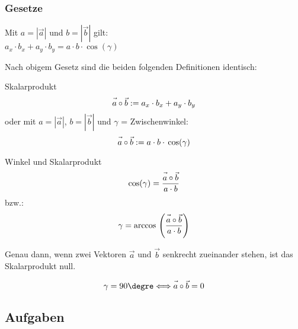 \subsubsection{Gesetze}
\begin{gesetz}{}{}
  Mit $a = |\vec{a}|$ und $b = |\vec{b}|$ gilt:\\
  $a_x\cdot{}b_x + a_y\cdot{}b_y = a\cdot{}b\cdot{}\cos(\gamma)$
\end{gesetz}
 

Nach obigem Gesetz sind die beiden folgenden Definitionen identisch:
\begin{definition}{Skalarprodukt}{}
  $$\vec{a\vphantom{b}}\circ\vec{b} := a_x\cdot{}b_x + a_y \cdot{} b_y$$
oder mit $a=|\vec{a}|$, $b=|\vec{b}|$ und $\gamma$ = Zwischenwinkel:
  $$\vec{a\vphantom{b}}\circ\vec{b} := a\cdot{}b\cdot{}\cos({\gamma})$$
\end{definition}


\begin{gesetz}{Winkel und Skalarprodukt}{}
  $$\cos(\gamma) = \frac{\vec{a\vphantom{b}}\circ\vec{b}}{a\cdot b}$$
  bzw.:
  $$\gamma = \arccos{} \left(\frac{\vec{a\vphantom{b}}\circ\vec{b}}{a\cdot b}\right)$$
  
\end{gesetz}

\begin{bemerkung}{}{}
  Genau dann, wenn zwei Vektoren $\vec{a}$ und $\vec{b}$ senkrecht
  zueinander stehen, ist das Skalarprodukt null.

  $$\gamma=90\degre   \Longleftrightarrow  \vec{a\vphantom{b}}\circ\vec{b}=0$$
  \end{bemerkung}


\subsection*{Aufgaben}


\newpage

